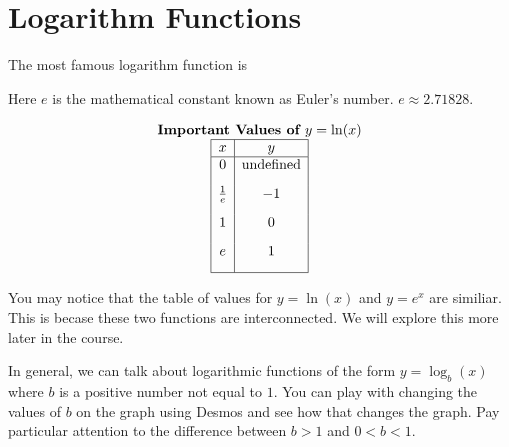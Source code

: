\documentclass[nooutcomes]{ximera}
\begin{document}
\newpage


\section{Logarithm Functions}


The most famous logarithm function is
\begin{image}
\end{image}
 
Here $e$ is the mathematical constant known as Euler's number. $e \approx 2.71828$.

\begin{image}
\end{image}



\[
\begin{array}{ c  }
  \text{\textbf{Important Values of $y=\ln(x)$}}\\
 \begin{array}{|c|c|}
 \hline
 x & y\\
 \hline
0&\text{undefined}\\[2ex]
\frac{1}{e}&-1\\[2ex]
1&0\\[2ex]
e&1\\[2ex]
 \hline
 \end{array}
\end{array}
 \]


You may notice that the table of values for $y=\ln(x)$ and $y=e^x$ are similiar.  This is becase these two functions are interconnected.  We will explore this more later in the course.



In general, we can talk about logarithmic functions of the form $y=\log_b(x)$ where $b$ is a positive number not equal to $1$.  You can play with changing the values of $b$ on the graph using Desmos and see how that changes the graph.  Pay particular attention to the difference between $b>1$ and $0<b<1$.
\end{document}
